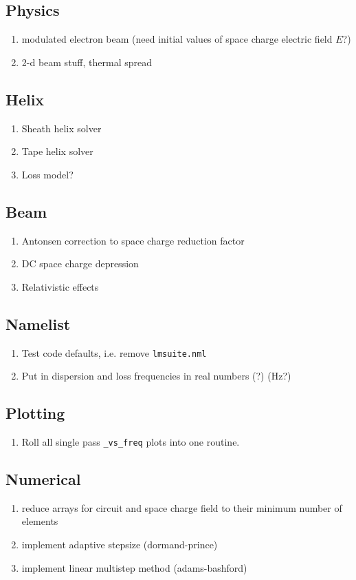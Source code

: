 \documentclass{article}
\begin{document}
\subsection{Physics}
\begin{enumerate}
\item modulated electron beam (need initial values of space charge electric
  field $E$?)
\item 2-d beam stuff, thermal spread
\end{enumerate}
\subsection{Helix}
\begin{enumerate}
\item Sheath helix solver
\item Tape helix solver
\item Loss model?
\end{enumerate}
\subsection{Beam}
\begin{enumerate}
\item Antonsen correction to space charge reduction factor
\item DC space charge depression
\item Relativistic effects
\end{enumerate}
\subsection{Namelist}
\begin{enumerate}
\item Test code defaults, i.e. remove {\tt lmsuite.nml}
\item Put in dispersion and loss frequencies in real numbers (?) (Hz?)
\end{enumerate}
\subsection{Plotting}
\begin{enumerate}
\item Roll all single pass {\tt *\_vs\_freq} plots into one routine.
\end{enumerate}
\subsection{Numerical}
\begin{enumerate}
\item reduce arrays for circuit and space charge field to their minimum
  number of elements
\item implement adaptive stepsize (dormand-prince)
\item implement linear multistep method (adams-bashford)
\end{enumerate}
\end{document}
